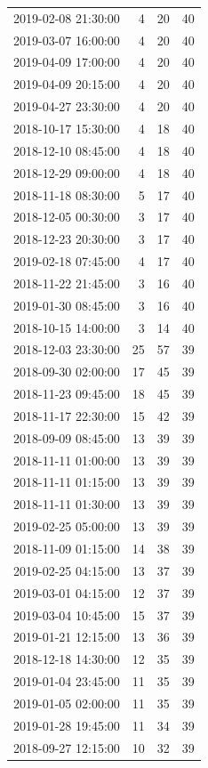 \begin{tabular}{lrrr}
2019-02-08 21:30:00 & 4 & 20 & 40 \\
2019-03-07 16:00:00 & 4 & 20 & 40 \\
2019-04-09 17:00:00 & 4 & 20 & 40 \\
2019-04-09 20:15:00 & 4 & 20 & 40 \\
2019-04-27 23:30:00 & 4 & 20 & 40 \\
2018-10-17 15:30:00 & 4 & 18 & 40 \\
2018-12-10 08:45:00 & 4 & 18 & 40 \\
2018-12-29 09:00:00 & 4 & 18 & 40 \\
2018-11-18 08:30:00 & 5 & 17 & 40 \\
2018-12-05 00:30:00 & 3 & 17 & 40 \\
2018-12-23 20:30:00 & 3 & 17 & 40 \\
2019-02-18 07:45:00 & 4 & 17 & 40 \\
2018-11-22 21:45:00 & 3 & 16 & 40 \\
2019-01-30 08:45:00 & 3 & 16 & 40 \\
2018-10-15 14:00:00 & 3 & 14 & 40 \\
2018-12-03 23:30:00 & 25 & 57 & 39 \\
2018-09-30 02:00:00 & 17 & 45 & 39 \\
2018-11-23 09:45:00 & 18 & 45 & 39 \\
2018-11-17 22:30:00 & 15 & 42 & 39 \\
2018-09-09 08:45:00 & 13 & 39 & 39 \\
2018-11-11 01:00:00 & 13 & 39 & 39 \\
2018-11-11 01:15:00 & 13 & 39 & 39 \\
2018-11-11 01:30:00 & 13 & 39 & 39 \\
2019-02-25 05:00:00 & 13 & 39 & 39 \\
2018-11-09 01:15:00 & 14 & 38 & 39 \\
2019-02-25 04:15:00 & 13 & 37 & 39 \\
2019-03-01 04:15:00 & 12 & 37 & 39 \\
2019-03-04 10:45:00 & 15 & 37 & 39 \\
2019-01-21 12:15:00 & 13 & 36 & 39 \\
2018-12-18 14:30:00 & 12 & 35 & 39 \\
2019-01-04 23:45:00 & 11 & 35 & 39 \\
2019-01-05 02:00:00 & 11 & 35 & 39 \\
2019-01-28 19:45:00 & 11 & 34 & 39 \\
2018-09-27 12:15:00 & 10 & 32 & 39 \\

\end{tabular}
